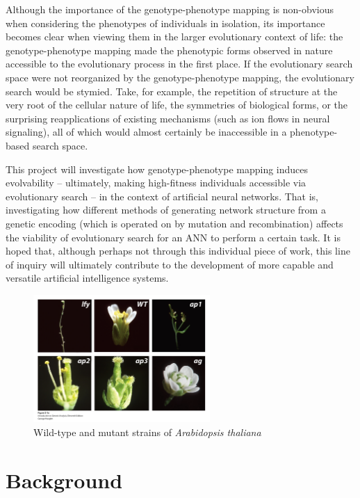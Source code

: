\documentclass[a4paper]{article}
\begin{document}
Although the importance of the genotype-phenotype mapping is non-obvious when considering the phenotypes of individuals in isolation, its importance becomes clear when viewing them in the larger evolutionary context of life: the genotype-phenotype mapping made the phenotypic forms observed in nature accessible to the evolutionary process in the first place. If the evolutionary search space were not reorganized by the genotype-phenotype mapping, the evolutionary search would be stymied.  Take, for example, the repetition of structure at the very root of the cellular nature of life, the symmetries of biological forms, or the surprising  reapplications of existing mechanisms (such as ion flows in neural signaling), all of which would almost certainly be inaccessible in a phenotype-based search space.

This project will investigate how genotype-phenotype mapping induces evolvability -- ultimately, making high-fitness individuals accessible via evolutionary search -- in the context of artificial neural networks. That is, investigating how different methods of generating network structure from a genetic encoding (which is operated on by mutation and recombination) affects the viability of evolutionary search for an ANN to perform a certain task. It is hoped that, although perhaps not through this individual piece of work, this line of inquiry will ultimately contribute to the development of more capable and versatile artificial intelligence systems.

\begin{figure}
\centering
\includegraphics[width=0.6\textwidth]{arabidopsis_mutations.png}
\caption{\label{fig:arabidopsis_mutants}Wild-type and mutant strains of \textit{Arabidopsis thaliana} \cite{Griffiths2015IntroductionAnalysis}} 
\end{figure}

\section{Background}
\end{document}

